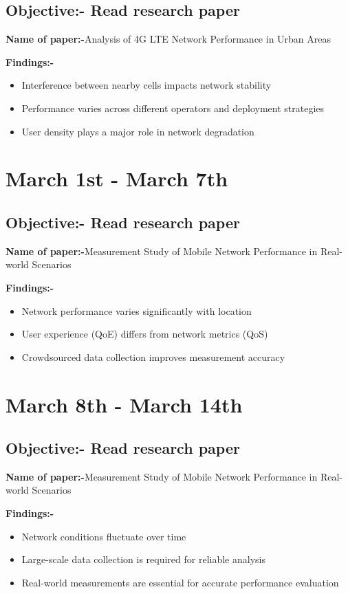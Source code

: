 \documentclass{article}
\begin{document}
\subsection{Objective:- Read research paper }\par
\textbf{Name of paper:-}Analysis of 4G LTE Network Performance in Urban Areas\par
\vspace{2mm}
\textbf{Findings:-}
\begin{itemize}
\item Interference between nearby cells impacts network stability
\item Performance varies across different operators and deployment strategies
\item User density plays a major role in network degradation
\end{itemize}


\section{March 1st - March 7th}
\subsection{Objective:- Read research paper }\par
\textbf{Name of paper:-}Measurement Study of Mobile Network Performance in Real-world Scenarios\par
\vspace{2mm}
\textbf{Findings:-}
\begin{itemize}
\item Network performance varies significantly with location
\item User experience (QoE) differs from network metrics (QoS)
\item Crowdsourced data collection improves measurement accuracy
\end{itemize}


\section{March 8th - March 14th}
\subsection{Objective:- Read research paper }\par
\textbf{Name of paper:-}Measurement Study of Mobile Network Performance in Real-world Scenarios\par
\vspace{2mm}
\textbf{Findings:-}
\begin{itemize}
\item Network conditions fluctuate over time
\item Large-scale data collection is required for reliable analysis
\item Real-world measurements are essential for accurate performance evaluation
\end{itemize}
\end{document}
